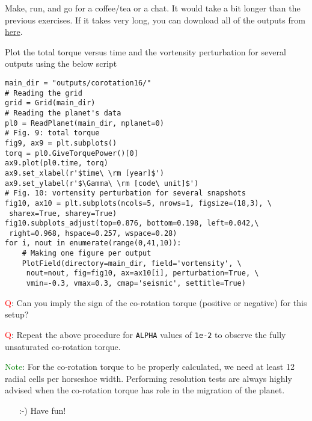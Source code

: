 \documentclass[14pt]{scrartcl}
\begin{document}
Make, run, and go for a coffee/tea or a chat. It would take a bit longer than the previous exercises. If it takes very long, you can download all of the outputs from \href{https://fumdrive.um.ac.ir/index.php/s/ac6t3bdYtZZqjTi}{here}.

Plot the total torque versus time and the vortensity perturbation for several outputs using the below script

\begin{verbatim}
main_dir = "outputs/corotation16/"
# Reading the grid
grid = Grid(main_dir)
# Reading the planet's data
pl0 = ReadPlanet(main_dir, nplanet=0)
# Fig. 9: total torque
fig9, ax9 = plt.subplots()
torq = pl0.GiveTorquePower()[0]
ax9.plot(pl0.time, torq)
ax9.set_xlabel(r'$time\ \rm [year]$')
ax9.set_ylabel(r'$\Gamma\ \rm [code\ unit]$')
# Fig. 10: vortensity perturbation for several snapshots
fig10, ax10 = plt.subplots(ncols=5, nrows=1, figsize=(18,3), \
 sharex=True, sharey=True)
fig10.subplots_adjust(top=0.876, bottom=0.198, left=0.042,\
 right=0.968, hspace=0.257, wspace=0.28)
for i, nout in enumerate(range(0,41,10)):
    # Making one figure per output
    PlotField(directory=main_dir, field='vortensity', \
     nout=nout, fig=fig10, ax=ax10[i], perturbation=True, \
     vmin=-0.3, vmax=0.3, cmap='seismic', settitle=True)
\end{verbatim}

\textcolor{red}{Q}: Can you imply the sign of the co-rotation torque (positive or negative) for this setup?

\textcolor{red}{Q}: Repeat the above procedure for \texttt{ALPHA} values of \texttt{1e-2} to observe the fully unsaturated co-rotation torque.

\textcolor{green}{Note}: For the co-rotation torque to be properly calculated, we need at least 12 radial cells per horseshoe width. Performing resolution tests are always highly advised when the co-rotation torque has role in the migration of the planet.

\begin{itemize}
\item[:-)] Have fun!
\end{itemize}
\end{document}
